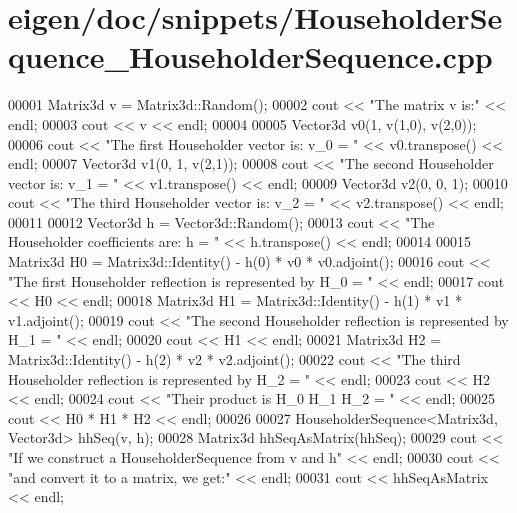 \hypertarget{eigen_2doc_2snippets_2_householder_sequence___householder_sequence_8cpp_source}{}\section{eigen/doc/snippets/\+Householder\+Sequence\+\_\+\+Householder\+Sequence.cpp}
\label{eigen_2doc_2snippets_2_householder_sequence___householder_sequence_8cpp_source}

\begin{DoxyCode}
00001 Matrix3d v = Matrix3d::Random();
00002 cout << \textcolor{stringliteral}{"The matrix v is:"} << endl;
00003 cout << v << endl;
00004 
00005 Vector3d v0(1, v(1,0), v(2,0));
00006 cout << \textcolor{stringliteral}{"The first Householder vector is: v\_0 = "} << v0.transpose() << endl;
00007 Vector3d v1(0, 1, v(2,1));
00008 cout << \textcolor{stringliteral}{"The second Householder vector is: v\_1 = "} << v1.transpose()  << endl;
00009 Vector3d v2(0, 0, 1);
00010 cout << \textcolor{stringliteral}{"The third Householder vector is: v\_2 = "} << v2.transpose() << endl;
00011 
00012 Vector3d h = Vector3d::Random();
00013 cout << \textcolor{stringliteral}{"The Householder coefficients are: h = "} << h.transpose() << endl;
00014 
00015 Matrix3d H0 = Matrix3d::Identity() - h(0) * v0 * v0.adjoint();
00016 cout << \textcolor{stringliteral}{"The first Householder reflection is represented by H\_0 = "} << endl;
00017 cout << H0 << endl;
00018 Matrix3d H1 = Matrix3d::Identity() - h(1) * v1 * v1.adjoint();
00019 cout << \textcolor{stringliteral}{"The second Householder reflection is represented by H\_1 = "} << endl;
00020 cout << H1 << endl;
00021 Matrix3d H2 = Matrix3d::Identity() - h(2) * v2 * v2.adjoint();
00022 cout << \textcolor{stringliteral}{"The third Householder reflection is represented by H\_2 = "} << endl;
00023 cout << H2 << endl;
00024 cout << \textcolor{stringliteral}{"Their product is H\_0 H\_1 H\_2 = "} << endl;
00025 cout << H0 * H1 * H2 << endl;
00026 
00027 HouseholderSequence<Matrix3d, Vector3d> hhSeq(v, h);
00028 Matrix3d hhSeqAsMatrix(hhSeq);
00029 cout << \textcolor{stringliteral}{"If we construct a HouseholderSequence from v and h"} << endl;
00030 cout << \textcolor{stringliteral}{"and convert it to a matrix, we get:"} << endl;
00031 cout << hhSeqAsMatrix << endl;
\end{DoxyCode}
